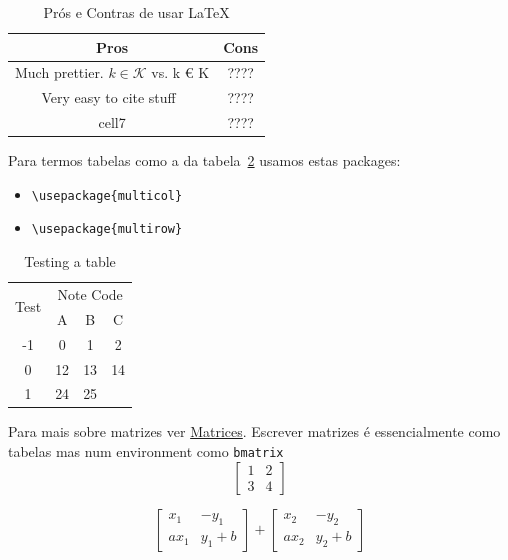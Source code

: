 \documentclass[10pt]{article}
\begin{document}

\begin{table}[h]
    \centering
    \begin{tabular}{c|c}
         Pros & Cons \\    
        \hline
         Much prettier. $k \in \mathcal{K}$ vs. k € K & ???? \\ 
         Very easy to cite stuff~\cite{how_to_cite_stuff} & ????  \\
         cell7 & ????  \\ 
    \end{tabular}
    \caption{Prós e Contras de usar \LaTeX}
    \label{tab:my_label}
\end{table}



Para termos tabelas como a da tabela~\ref{tab:table_multi} usamos estas packages:
\begin{itemize}
    \item \verb|\usepackage{multicol}|
    \item \verb|\usepackage{multirow}|
\end{itemize}


\begin{table}[h!]
    \centering

    \begin{tabular}{ |c|c|c|c| }
    	\hline
    	\multirow{2}{*}{Test} & \multicolumn{3}{c|}{Note Code} \\
    	\cline{2-4}
    	& A & B & C \\
    	\hline
    	-1 & 0 & 1 & 2 \\
    	\hline
    	0 & 12 & 13 & 14 \\
    	\hline
    	1 & 24 & 25 \\
    	\cline{1-3} %
    \end{tabular}
    \caption{Testing a table}
    \label{tab:table_multi} %
\end{table}


Para mais sobre matrizes ver \href{https://www.overleaf.com/learn/latex/Matrices}{Matrices}.
Escrever matrizes é essencialmente como tabelas mas num environment como \verb|bmatrix|
$$
\left[\begin{matrix}
1 & 2\\
3 & 4
\end{matrix}\right]
$$

$$
\begin{bmatrix}
x_1 & -y_1\\
ax_1 & y_1+b
\end{bmatrix}
+
\begin{bmatrix}
x_2 & -y_2\\
ax_2 & y_2+b
\end{bmatrix}
$$
\end{document}
